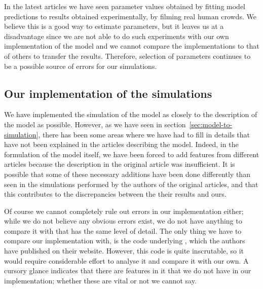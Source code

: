 In the latest articles we have seen parameter values obtained by fitting model 
predictions to results obtained experimentally, by filming real human crowds.  
We believe this is a good way to estimate parameters, but it leaves us at a 
disadvantage since we are not able to do such experiments with our own 
implementation of the model and we cannot compare the implementations to that 
of others to transfer the results. Therefore, selection of parameters 
continues to be a possible source of errors for our simulations.

\subsection{Our implementation of the simulations}
\label{sec:random-errors}
We have implemented the simulation of the model as closely to 
the description of the model as possible. However, as we have seen in 
section~\ref{sec:model-to-simulation}, there has been some areas where we have 
had to fill in details that have not been explained in the articles 
describing the model. Indeed, in the formulation of the model itself, we have 
been forced to add features from different articles because the description in 
the original article was insufficient. It is possible that some of these 
necessary additions have been done differently than seen in the simulations 
performed by the authors of the original articles, and that this contributes 
to the discrepancies between the their results and ours.

Of course we cannot completely rule out errors in our implementation either; 
while we do not believe any obvious errors exist, we do not have anything to 
compare it with that has the same level of detail. The only thing we have to 
compare our implementation with, is the code underlying \cite{helbing00}, 
which the authors have published on their website. However, this code is quite 
inscrutable, so it would require considerable effort to analyse it and compare 
it with our own. A cursory glance indicates that there are features in it that 
we do not have in our implementation; whether these are vital or not we cannot 
say.

